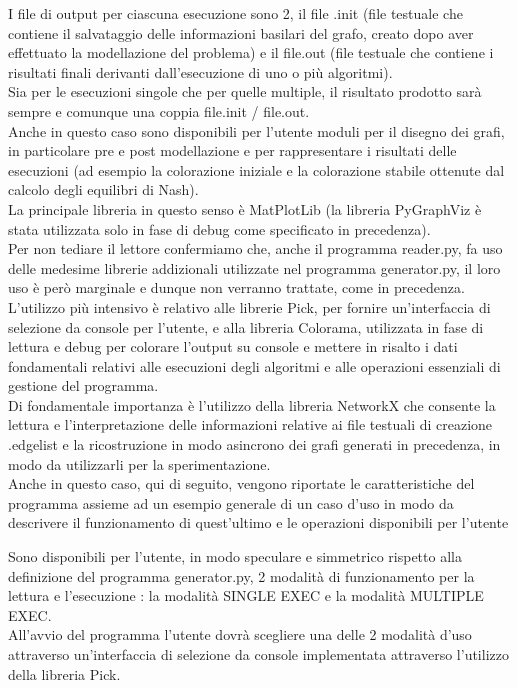 I file di output per ciascuna esecuzione sono 2, il file .init (file testuale che contiene il salvataggio delle informazioni basilari del grafo, creato dopo aver effettuato la modellazione del problema) e il file.out (file testuale che contiene i risultati finali derivanti dall'esecuzione di uno o più algoritmi).\\

Sia per le esecuzioni singole che per quelle multiple, il risultato prodotto sarà sempre e comunque una coppia file.init / file.out.\\  

Anche in questo caso sono disponibili per l'utente moduli per il disegno dei grafi, in particolare pre e post modellazione e per rappresentare i risultati delle esecuzioni (ad esempio la colorazione iniziale e la colorazione stabile ottenute dal calcolo degli equilibri di Nash).\\
La principale libreria in questo senso è MatPlotLib (la libreria PyGraphViz è stata utilizzata solo in fase di debug come specificato in precedenza).\\

Per non tediare il lettore confermiamo che, anche il programma reader.py, fa uso delle medesime librerie addizionali utilizzate nel programma generator.py, il loro uso è però marginale e dunque non verranno trattate, come in precedenza.\\
L'utilizzo più intensivo è relativo alle librerie Pick, per fornire un'interfaccia di selezione da console per l'utente, e alla libreria Colorama, utilizzata in fase di lettura e debug per colorare l'output su console e mettere in risalto i dati fondamentali relativi alle esecuzioni degli algoritmi e alle operazioni essenziali di gestione del programma.\\

Di fondamentale importanza è l'utilizzo della libreria NetworkX che consente la lettura e l'interpretazione delle informazioni relative ai file testuali di creazione .edgelist e la ricostruzione in modo asincrono dei grafi generati in precedenza, in modo da utilizzarli per la sperimentazione.\\

Anche in questo caso, qui di seguito, vengono riportate le caratteristiche del programma assieme ad un esempio generale di un caso d'uso in modo da descrivere il funzionamento di quest'ultimo e le operazioni disponibili per l'utente

Sono disponibili per l'utente, in modo speculare e simmetrico rispetto alla definizione del programma generator.py, 2 modalità di funzionamento per la lettura e l'esecuzione : la modalità SINGLE EXEC e la modalità MULTIPLE EXEC.\\
All'avvio del programma l'utente dovrà scegliere una delle 2 modalità d'uso attraverso un'interfaccia di selezione da console implementata attraverso l'utilizzo della libreria Pick.\\


